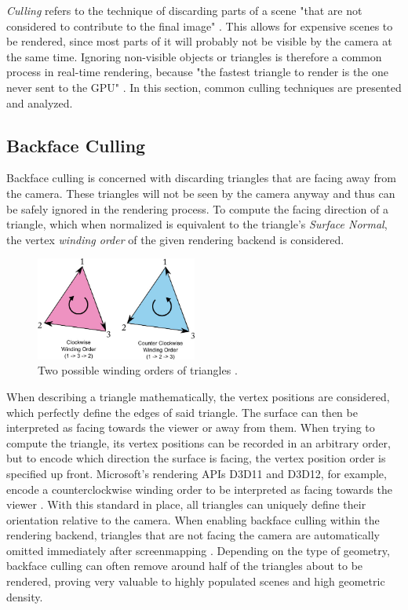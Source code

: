 \emph{Culling} refers to the technique of discarding parts of a scene "that are not considered to contribute to 
the final image" \cite{AkenineMoeller2018}. This allows for expensive scenes to be rendered, since most parts of it 
will probably not be visible by the camera at the same time. Ignoring non-visible objects or triangles is therefore a 
common process in real-time rendering, because "the fastest triangle to render is the one never sent to the \ac{GPU}" 
\cite{AkenineMoeller2018}. In this section, common culling techniques are presented and analyzed. 


\subsection*{Backface Culling} \label{subsec-backface-culling}

Backface culling is concerned with discarding triangles that are facing away from the camera. 
These triangles will not be seen by the camera anyway and thus can be safely ignored in the rendering process. 
To compute the facing direction of a triangle, which when normalized is equivalent to the triangle's 
\emph{Surface Normal}, the vertex \emph{winding order} of the given rendering backend is considered.

\begin{figure}[h]
    \centering
    \includegraphics[width=200px]{images/graphics/winding-order-triangle.jpg}
    \caption{Two possible winding orders of triangles \cite{Michel2016}.}
    \label{fig:triangle-winding-order}
\end{figure}

\noindent
When describing a triangle mathematically, the vertex positions are considered, which perfectly define the edges of 
said triangle. The surface can then be interpreted as facing towards the viewer or away from them. 
When trying to compute the triangle, its vertex positions can be recorded in an arbitrary order, but to encode which 
direction the surface is facing, the vertex position order is specified up front. Microsoft's rendering \ac{API}s D3D11 
and D3D12, for example, encode a counterclockwise winding order to be interpreted as facing towards the viewer 
\cite{D3DTopology2020}. With this standard in place, all triangles can uniquely define their orientation relative to 
the camera. When enabling backface culling within the rendering backend, triangles that are not facing the camera 
are automatically omitted immediately after screenmapping \cite{AkenineMoeller2018}. Depending on the type of geometry, 
backface culling can often remove around half of the triangles about to be rendered, proving very valuable to highly 
populated scenes and high geometric density.

